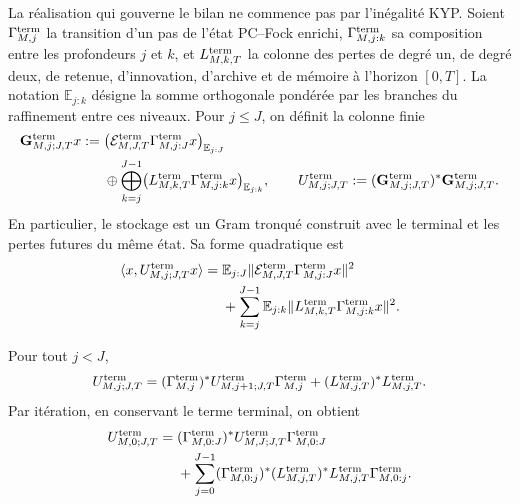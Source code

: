 La réalisation qui gouverne le bilan ne commence pas par l'inégalité KYP. Soient \(\Gamma_{M,j}^{\rm term}\) la transition d'un pas de l'état PC--Fock enrichi, \(\Gamma_{M,j:k}^{\rm term}\) sa composition entre les profondeurs \(j\) et \(k\), et \(L_{M,k,T}^{\rm term}\) la colonne des pertes de degré un, de degré deux, de retenue, d'innovation, d'archive et de mémoire à l'horizon \([0,T]\). La notation \(\mathbb E_{j:k}\) désigne la somme orthogonale pondérée par les branches du raffinement entre ces niveaux. Pour \(j\leq J\), on définit la colonne finie
\begin{equation}\label{eq:amp-ns-owner-columna-gram-truncado}
 \begin{aligned}
 \mathbf G_{M,j;J,T}^{\rm term}x
 :={}&
 \bigl(\mathcal E_{M,J,T}^{\rm term}
       \Gamma_{M,j:J}^{\rm term}x\bigr)_{\mathbb E_{j:J}}\\
 &\oplus
 \bigoplus_{k=j}^{J-1}
 \bigl(L_{M,k,T}^{\rm term}
       \Gamma_{M,j:k}^{\rm term}x\bigr)_{\mathbb E_{j:k}},
 \qquad
 U_{M,j;J,T}^{\rm term}
 :=(\mathbf G_{M,j;J,T}^{\rm term})^*
    \mathbf G_{M,j;J,T}^{\rm term}.
 \end{aligned}
\end{equation}
En particulier, le stockage est un Gram tronqué construit avec le terminal et les pertes futures du même état. Sa forme quadratique est
\begin{equation}\label{eq:amp-ns-owner-gram-truncado}
 \begin{aligned}
 \langle x,U_{M,j;J,T}^{\rm term}x\rangle
 ={}&\mathbb E_{j:J}
 \|\mathcal E_{M,J,T}^{\rm term}
       \Gamma_{M,j:J}^{\rm term}x\|^2\\
 &+\sum_{k=j}^{J-1}\mathbb E_{j:k}
 \|L_{M,k,T}^{\rm term}
       \Gamma_{M,j:k}^{\rm term}x\|^2 .
 \end{aligned}
\end{equation}

\begin{lemma}
\label{lem:amp-ns-owner-stein-truncado}
Pour tout \(j<J\),
\begin{equation}\label{eq:amp-ns-owner-stein-truncado}
 U_{M,j;J,T}^{\rm term}
 =(\Gamma_{M,j}^{\rm term})^*
   U_{M,j+1;J,T}^{\rm term}\Gamma_{M,j}^{\rm term}
  +(L_{M,j,T}^{\rm term})^*L_{M,j,T}^{\rm term}.
\end{equation}
Par itération, en conservant le terme terminal, on obtient
\begin{equation}\label{eq:amp-ns-owner-telescopio-truncado}
 \begin{aligned}
 U_{M,0;J,T}^{\rm term}
 ={}&(\Gamma_{M,0:J}^{\rm term})^*
      U_{M,J;J,T}^{\rm term}\Gamma_{M,0:J}^{\rm term}\\
 &+\sum_{j=0}^{J-1}
   (\Gamma_{M,0:j}^{\rm term})^*
   (L_{M,j,T}^{\rm term})^*L_{M,j,T}^{\rm term}
   \Gamma_{M,0:j}^{\rm term}.
 \end{aligned}
\end{equation}
\end{lemma}

